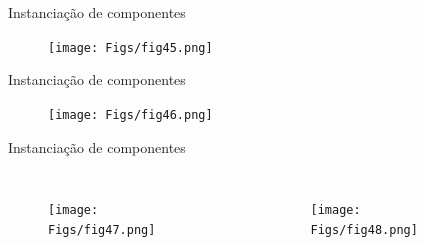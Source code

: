\documentclass[aspectratio=169]{beamer}
\begin{document}
\begin{frame}{Instanciação de componentes}
	\justifying
	
%		
	
	\begin{figure}[h]
		\centering
		\texttt{[image: Figs/fig45.png]}
	\end{figure}
	
	
\end{frame}

\begin{frame}{Instanciação de componentes}
	\justifying
	
	
	\begin{figure}[h]
	\centering
	\texttt{[image: Figs/fig46.png]}
	\end{figure}
	

%	
%	

	
\end{frame}


\begin{frame}{Instanciação de componentes}
	\justifying
	
	
	
	
	\begin{columns}
		
		\begin{figure}[h]
			\centering
			\texttt{[image: Figs/fig47.png]}
		\end{figure}
		
		\begin{figure}[h]
			\centering
			\texttt{[image: Figs/fig48.png]}
		\end{figure}
	\end{columns}
	
	
\end{frame}
\end{document}
